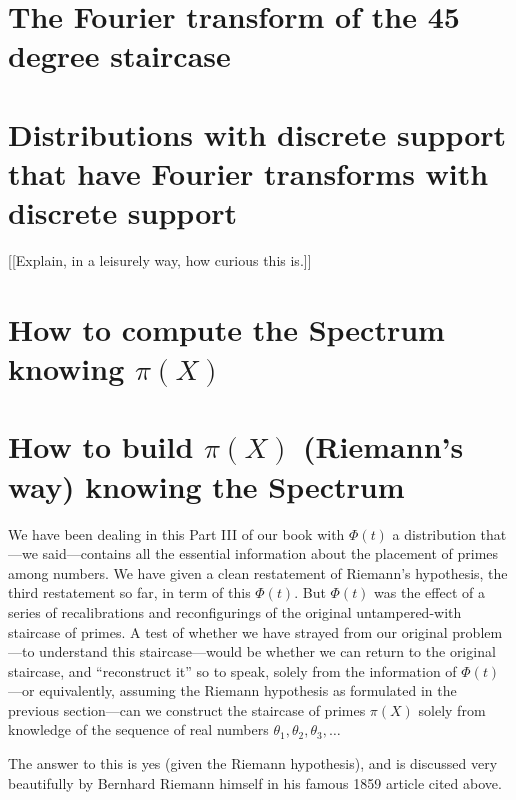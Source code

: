 \documentclass[11pt]{article}
\theoremstyle{plain}
\theoremstyle{definition}
\numberwithin{equation}{section}
\numberwithin{figure}{section}
\numberwithin{table}{section}
\begin{document}
\section{The Fourier transform of the 45 degree staircase}

\section{Distributions with discrete support that have Fourier
  transforms with discrete support\label{sec:dd}}
[[Explain, in a leisurely way, how curious this is.]]

\section{How to compute the Spectrum knowing $\pi(X)$}

\section{How to build $\pi(X)$ (Riemann's way) knowing the Spectrum}


  We have been dealing in this Part III of our book with $\Phi(t)$ a
  distribution that---we said---contains all the essential information
  about the placement of primes among numbers. We have given a clean
  restatement of Riemann's hypothesis, the third restatement so far,
  in term of this $\Phi(t)$.  But $\Phi(t)$ was the effect of a series
  of recalibrations and reconfigurings of the original untampered-with
  staircase of primes.  A test of whether we have strayed from our
  original problem---to understand this staircase---would be whether
  we can return to the original staircase, and ``reconstruct it'' so to
  speak, solely from the information of $\Phi(t)$---or equivalently,
  assuming the Riemann hypothesis as formulated in the previous
  section---can we construct the staircase of primes $\pi(X)$ solely
  from knowledge of the sequence of real numbers $\theta_1,
  \theta_2,\theta_3,\dots$
  
  
\bigskip

The answer to this  is yes (given the Riemann hypothesis), and is discussed very beautifully  by Bernhard
Riemann himself in his famous 1859 article cited above.
\end{document}
